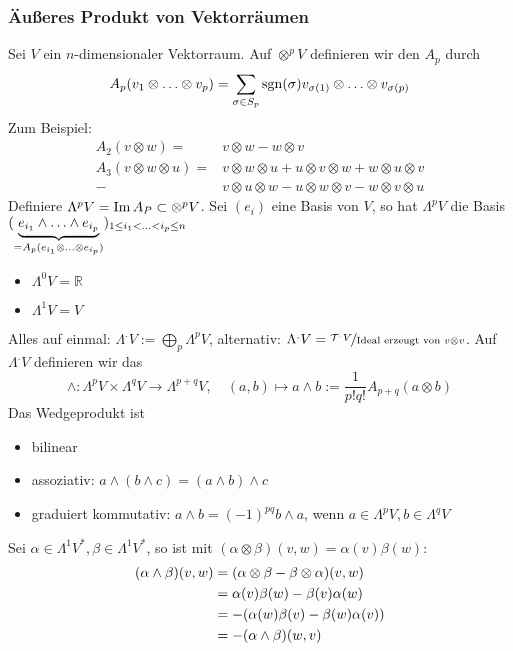 \subsubsection{Äußeres Produkt von Vektorräumen}
\label{ssub:188}
Sei $V$ ein $n$-dimensionaler Vektorraum. Auf $\otimes^p V$ definieren wir den  $A_p$ durch
\[
A_p (v_1\otimes \ldots \otimes v_p) = \sum_{\sigma \in S_p} \operatorname{sgn}(\sigma) v_{\sigma(1)}\otimes \ldots \otimes v_{\sigma(p)}
\]
Zum Beispiel:
\begin{align*}
A_2(v\otimes w) = &v\otimes w - w\otimes v\\
A_3(v\otimes w\otimes u) = &v\otimes w\otimes u + u\otimes v \otimes w + w\otimes u \otimes v\\
 -& v\otimes u \otimes w - u\otimes w \otimes v - w\otimes v \otimes u
\end{align*}
Definiere $\Lambda^p V = \operatorname{Im} A_P \subset \otimes^p V$. Sei $(e_i)$ eine Basis von $V$, so hat $\Lambda^p V$ die Basis $(\underbrace{e_{i_1}\wedge \ldots \wedge e_{i_p}}_{= A_p(e_{i_1}\otimes \ldots \otimes e_{i_p})})_{1\leq i_1 < \ldots < i_p \leq n}$
\begin{itemize}
\item $\Lambda^0 V = \mathds{R}$
\item $\Lambda^1 V = V$
\end{itemize}
Alles auf einmal: $\Lambda^. V := \bigoplus\limits_p \Lambda^p V$, alternativ: $\Lambda^. V = \nicefrac{\mathcal{T}^. V}{\text{Ideal erzeugt von } v\otimes v}$. Auf $\Lambda^. V$ definieren wir das 
\[
\wedge: \Lambda^p V\times \Lambda^q V \to \Lambda^{p+q} V,\quad (a,b) \mapsto a\wedge b := \frac{1}{p!q!} A_{p+q}(a\otimes b)
\]
Das Wedgeprodukt ist
\begin{itemize}
\item bilinear
\item assoziativ: $a\wedge (b\wedge c) = (a\wedge b)\wedge c$
\item graduiert kommutativ: $a\wedge b = (-1)^{pq} b\wedge a$, wenn $a \in \Lambda^p V, b\in \Lambda^q V$
\end{itemize}
Sei $\alpha \in \Lambda^1 V^*, \beta \in \Lambda^1 V^*$, so ist mit $(\alpha \otimes \beta)(v,w) = \alpha(v)\beta(w)$:
\begin{align*}
(\alpha \wedge \beta)(v,w) &= (\alpha\otimes \beta - \beta \otimes \alpha)(v,w)\\
&= \alpha(v)\beta(w) - \beta(v)\alpha(w)\\
&= -(\alpha(w)\beta(v) - \beta(w)\alpha(v))\\
&= - (\alpha \wedge \beta)(w,v)
\end{align*}

